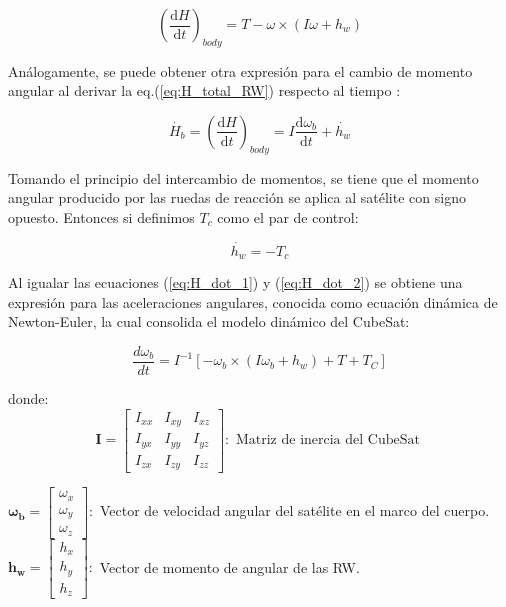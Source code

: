   \begin{equation}\label{eq:H_dot_1}
 	 \left(\frac{\mathrm{d} H}{\mathrm{d} t}\right)_{body} = T-\omega \times \left(I\omega + h_w\right) 	
 \end{equation}
 
 Análogamente, se puede obtener otra expresión para el cambio de momento angular al derivar la eq.(\ref{eq:H_total_RW}) respecto al tiempo :
 
 \begin{equation}\label{eq:H_dot_2}
 	\dot{H_b} = \left(\frac{\mathrm{d} H}{\mathrm{d} t}\right)_{body} = 
 	I\frac{\mathrm{d} \omega_b}{\mathrm{d} t} + \dot{h_w}  	
 \end{equation}
 
Tomando el principio del intercambio de momentos, se tiene que el momento angular producido por las ruedas de reacción se aplica al satélite con signo opuesto. Entonces si definimos $T_c$ como el par de control:

\begin{equation}
	\dot{h_w} = -T_c  	
\end{equation}

Al igualar las ecuaciones (\ref{eq:H_dot_1}) y (\ref{eq:H_dot_2}) se obtiene una expresión para las aceleraciones angulares, conocida como ecuación dinámica de Newton-Euler, la cual consolida el modelo dinámico del CubeSat:


\begin{equation}\label{eq:modelo_dinamico}
	\frac{d \omega_b}{d t}=I^{-1}\left[-\omega_b \times\left(I \omega_b+h_w\right)+T+T_C\right]	
\end{equation}

donde:
$$
\mathbf{I}=\left[\begin{array}{ccc}
	I_{x x} & I_{x y} & I_{x z} \\
	I_{y x} & I_{y y} & I_{y z} \\
	I_{z x} & I_{z y} & I_{z z}
\end{array}\right]:\text { Matriz de inercia del CubeSat }
$$

$\mathbf{\omega_b}=\left[\begin{array}{l}\omega_x \\ \omega_y \\ \omega_z\end{array}\right]:$ Vector de velocidad angular del satélite en el marco del cuerpo.\\[5pt]	

$\mathbf{h_w}=\left[\begin{array}{l}h_x \\ h_y \\ h_z\end{array}\right]:$ Vector de momento de angular de las RW.\\[10pt]	

